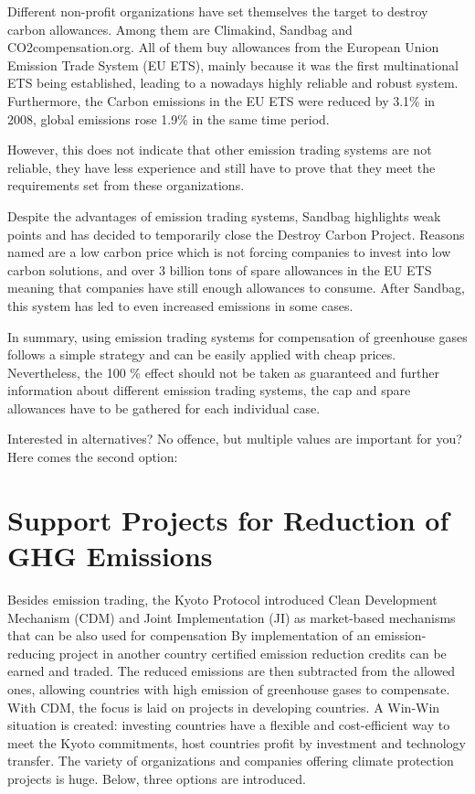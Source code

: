 Different non-profit organizations have set themselves the target to destroy carbon allowances. Among them are Climakind, Sandbag and CO2compensation.org. %
All of them buy allowances from the European Union Emission Trade System (EU ETS), mainly because it was the first multinational ETS being established, leading to a nowadays highly reliable and robust system. Furthermore, the Carbon emissions in the EU ETS were reduced by 3.1\% in 2008, global emissions rose 1.9\% in the same time period. 
\cite{climakind_2} %

However, this does not indicate that other emission trading systems are not reliable, they have less experience and still have to prove that they meet the requirements set from these organizations. 

Despite the advantages of emission trading systems, Sandbag highlights weak points and has decided to temporarily close the Destroy Carbon Project. Reasons named are a low carbon price which is not forcing companies to invest into low carbon solutions, and over 3 billion tons of spare allowances in the EU ETS meaning that companies have still enough allowances to consume. After Sandbag, this system has led to even increased emissions in some cases. \cite{sandbag}


In summary, using emission trading systems for compensation of greenhouse gases follows a simple strategy and can be easily applied with cheap prices. Nevertheless, the 100 \% effect should not be taken as guaranteed and further information about different emission trading systems, the cap and spare allowances have to be gathered for each individual case. 


Interested in alternatives? No offence, but multiple values are important for you? Here comes the second option:

\section{Support Projects for Reduction of GHG Emissions}	

Besides emission trading, the Kyoto Protocol introduced Clean Development Mechanism (CDM) and Joint Implementation (JI) as market-based mechanisms that can be also used for compensation \cite{unfccc} %
By implementation of an emission-reducing project in another country certified emission reduction credits can be earned and traded. The reduced emissions are then subtracted from the allowed ones, allowing countries with high emission of greenhouse gases to compensate. With CDM, the focus is laid on projects in developing countries. A Win-Win situation is created: investing countries have a flexible and cost-efficient way to meet the Kyoto commitments, host countries profit by investment and technology transfer.
The variety of organizations and companies offering climate protection projects is huge. Below, three options are introduced.

